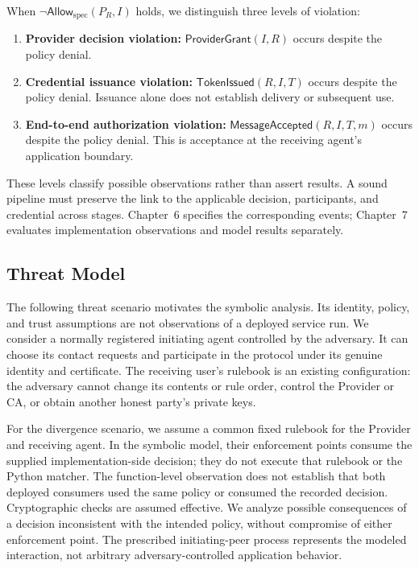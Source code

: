 When $\neg\mathsf{Allow}_{\mathrm{spec}}(P_R,I)$ holds, we distinguish three
levels of violation:
\begin{enumerate}
  \item \textbf{Provider decision violation:}
    $\mathsf{ProviderGrant}(I,R)$ occurs despite the policy denial.
  \item \textbf{Credential issuance violation:}
    $\mathsf{TokenIssued}(R,I,T)$ occurs despite the policy denial.
    Issuance alone does not establish delivery or subsequent use.
  \item \textbf{End-to-end authorization violation:}
    $\mathsf{MessageAccepted}(R,I,T,m)$ occurs despite the policy denial.
    This is acceptance at the receiving agent's application boundary.
\end{enumerate}
These levels classify possible observations rather than assert results.
A sound pipeline must preserve the link to the applicable decision,
participants, and credential across stages. Chapter~6 specifies the
corresponding events; Chapter~7 evaluates implementation observations and
model results separately.


\subsection{Threat Model}

The following threat scenario motivates the symbolic analysis. Its identity,
policy, and trust assumptions are not observations of a deployed service run.
We consider a normally registered initiating agent controlled by the adversary.
It can choose its contact requests and participate in the protocol under its
genuine identity and certificate. The receiving user's rulebook is an existing
configuration: the adversary cannot change its contents or rule order, control
the Provider or CA, or obtain another honest party's private keys.

For the divergence scenario, we assume a common fixed rulebook for the Provider
and receiving agent. In the symbolic model, their enforcement points consume
the supplied implementation-side decision; they do not execute that rulebook
or the Python matcher. The function-level observation does not establish that
both deployed consumers used the same policy or consumed the recorded decision.
Cryptographic checks are assumed effective. We analyze possible consequences
of a decision inconsistent with the intended policy, without compromise of
either enforcement point. The prescribed initiating-peer process represents
the modeled interaction, not arbitrary adversary-controlled application behavior.

